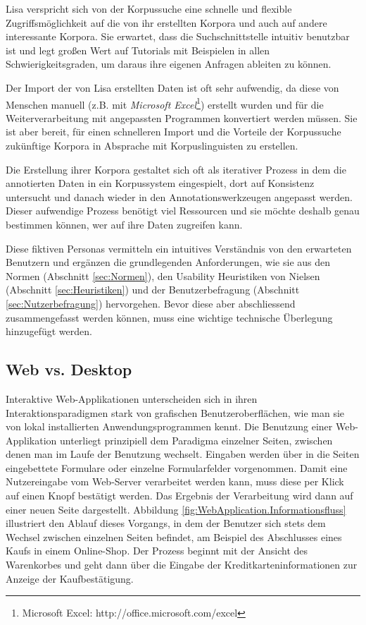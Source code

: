 \begin{description}
{		Lisa verspricht sich von der Korpussuche eine schnelle und flexible Zugriffsmöglichkeit auf die von ihr erstellten Korpora und auch auf andere interessante Korpora. Sie erwartet, dass die Suchschnittstelle intuitiv benutzbar ist und legt großen Wert auf Tutorials mit Beispielen in allen Schwierigkeitsgraden, um daraus ihre eigenen Anfragen ableiten zu können.
		
		Der Import der von Lisa erstellten Daten ist oft sehr aufwendig, da diese von Menschen manuell (z.B. mit \emph{Microsoft Excel}\footnote{Microsoft Excel: http://office.microsoft.com/excel}) erstellt wurden und für die Weiterverarbeitung mit angepassten Programmen konvertiert werden müssen. Sie ist aber bereit, für einen schnelleren Import und die Vorteile der Korpussuche zukünftige Korpora in Absprache mit Korpuslinguisten zu erstellen.
		
		
		Die Erstellung ihrer Korpora gestaltet sich oft als iterativer Prozess in dem die annotierten Daten in ein Korpussystem eingespielt, dort auf Konsistenz untersucht und danach wieder in den Annotationswerkzeugen angepasst werden. Dieser aufwendige Prozess benötigt viel Ressourcen und sie möchte deshalb genau bestimmen können, wer auf ihre Daten zugreifen kann.
	}
\end{description}

Diese fiktiven Personas vermitteln ein intuitives Verständnis von den erwarteten Benutzern und ergänzen die grundlegenden Anforderungen, wie sie aus den Normen (Abschnitt \ref{sec:Normen}), den Usability Heuristiken von Nielsen (Abschnitt \ref{sec:Heuristiken}) und der Benutzerbefragung (Abschnitt \ref{sec:Nutzerbefragung}) hervorgehen. Bevor diese aber abschliessend zusammengefasst werden können, muss eine wichtige technische Überlegung hinzugefügt werden.

\newpage
\subsection{Web vs. Desktop}\label{sec:Desktopanwendung}

Interaktive Web-Applikationen unterscheiden sich in ihren Interaktionsparadigmen stark von grafischen Benutzeroberflächen, wie man sie von lokal installierten Anwendungsprogrammen kennt. Die Benutzung einer Web-Applikation unterliegt prinzipiell dem Paradigma einzelner Seiten, zwischen denen man im Laufe der Benutzung wechselt. Eingaben werden über in die Seiten eingebettete Formulare oder einzelne Formularfelder vorgenommen. Damit eine Nutzereingabe vom Web-Server verarbeitet werden kann, muss diese per Klick auf einen Knopf bestätigt werden. Das Ergebnis der Verarbeitung wird dann auf einer neuen Seite dargestellt. Abbildung \ref{fig:WebApplication.Informationsfluss} illustriert den Ablauf dieses Vorgangs, in dem der Benutzer sich stets dem Wechsel zwischen einzelnen Seiten befindet, am Beispiel des Abschlusses eines Kaufs in einem Online-Shop. Der Prozess beginnt mit der Ansicht des Warenkorbes und geht dann über die Eingabe der Kreditkarteninformationen zur Anzeige der Kaufbestätigung.

